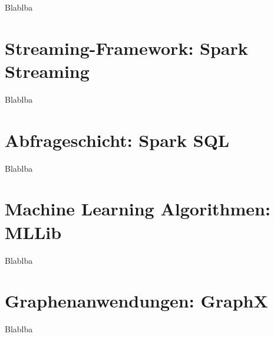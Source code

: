 Blablba

\section{Streaming-Framework: Spark Streaming}
\label{section:streaming}

Blablba

\section{Abfrageschicht: Spark SQL}
\label{section:spark sql}

Blablba

\section{Machine Learning Algorithmen: MLLib}
\label{section:mllib arch}

Blablba



\section{Graphenanwendungen: GraphX}
\label{section:graphx}

Blablba

